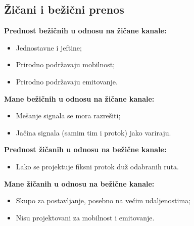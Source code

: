 \documentclass[a4paper]{article}
\begin{document}
        \subsection{Žičani i bežični prenos}
        \noindent \textbf{Prednost bežičnih u odnosu na žičane kanale:}
        \begin{itemize}
            \item Jednostavne i jeftine;
            \item Prirodno podržavaju mobilnost;
            \item Prirodno podržavaju emitovanje.
        \end{itemize}
        \textbf{Mane bežičnih u odnosu na žičane kanale:}
        \begin{itemize}
            \item Mešanje signala se mora razrešiti;
            \item Jačina signala (samim tim i protok) jako variraju.
        \end{itemize}
        \textbf{Prednost žičanih u odnosu na bežične kanale:}
        \begin{itemize}
            \item Lako se projektuje fiksni protok duž odabranih ruta.
        \end{itemize}
        \textbf{Mane žičanih u odnosu na bežične kanale:}
        \begin{itemize}
            \item Skupo za postavljanje, posebno na većim udaljenostima;
            \item Nisu projektovani za mobilnost i emitovanje.
        \end{itemize}
\end{document}
